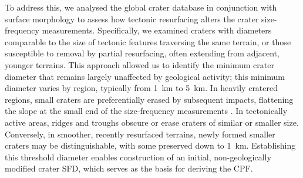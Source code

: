 \documentclass[preprint,11pt,3p,times,authoryear]{elsarticle}
\begin{document}
To address this, we analysed the global crater database in conjunction with surface morphology to assess how tectonic resurfacing alters the crater size-frequency measurements. Specifically, we examined craters with diameters comparable to the size of tectonic features traversing the same terrain, or those susceptible to removal by partial resurfacing, often extending from adjacent, younger terrains. This approach allowed us to identify the minimum crater diameter that remains largely unaffected by geological activity; this minimum diameter varies by region, typically from 1~km to 5~km. In heavily cratered regions, small craters are preferentially erased by subsequent impacts, flattening the slope at the small end of the size-frequency measurements \citep{DiSisto2016, Minton2019}. In tectonically active areas, ridges and troughs obscure or erase craters of similar or smaller size. Conversely, in smoother, recently resurfaced terrains, newly formed smaller craters may be distinguishable, with some preserved down to 1~km. Establishing this threshold diameter enables construction of an initial, non-geologically modified crater SFD, which serves as the basis for deriving the CPF.\\
\end{document}
